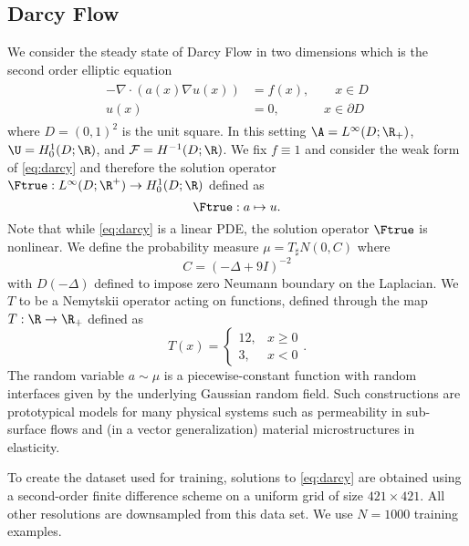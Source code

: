 \subsection{Darcy Flow}
\label{ssec:darcy}
We consider the steady state of Darcy Flow in two dimensions which is the second order elliptic equation
\begin{align}
\label{eq:darcy}
\begin{split}
- \nabla \cdot (a(x) \nabla u(x)) &= f(x), \qquad x \in D \\
u(x) &= 0, \qquad \quad \:\: x \in \partial D
\end{split}
\end{align}
where \(D = (0,1)^2\) is the unit square. In this setting \(\A = L^\infty(D;\R_+)\), \(\U = H_0^1(D;\R)\), and \(\mathcal{F} = H^{-1}(D;\R)\).
We fix \(f \equiv 1\) and consider the weak form of \eqref{eq:darcy} and therefore the solution operator \(\Ftrue : L^\infty(D;\R^+) \to H^1_0(D;\R)\) defined as
\begin{equation}
    \label{eq:darcysolutionop}
    \Ftrue:  a \mapsto u.
\end{equation}
Note that while \eqref{eq:darcy} is a linear PDE, the solution operator \(\Ftrue\) is nonlinear. We define the probability measure \(\mu = T_\sharp N(0,C)\)  where 
\[C = (-\Delta + 9I)^{-2}\]
with $D(-\Delta)$ defined to impose zero Neumann boundary on the Laplacian. We 
 \(T\) to be a Nemytskii operator acting on functions, defined through the map \(T : \R \to \R_+\) defined as
\[T(x) = \begin{cases}
12, & x \geq 0 \\
3, & x < 0
\end{cases}.\]
The random variable \(a \sim \mu\) is a piecewise-constant function with random interfaces given by the underlying Gaussian random field. Such constructions are prototypical models for many physical systems such as permeability in sub-surface flows and (in a vector
generalization) material microstructures in elasticity. 

To create the dataset used for training, solutions to \eqref{eq:darcy} are obtained using a second-order finite difference scheme on a uniform grid of size \(421 \times 421\). All other resolutions are downsampled from this data set. We use \(N = 1000\) training examples.

